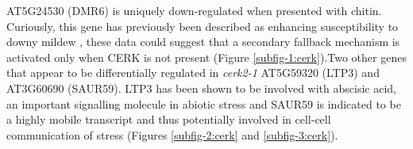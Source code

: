 \documentclass[../main.tex]{subfiles}
\begin{document}
AT5G24530 (DMR6) is uniquely down-regulated when presented with chitin.
Curiously, this gene has previously been described as enhancing susceptibility
to downy mildew \cite{DOWNYMILDEWRESISTANT}, these data could suggest that a
secondary fallback mechanism is activated only when CERK is not present (Figure
\ref{subfig-1:cerk}).Two other genes that appear to be differentially regulated
in \textit{cerk2-1} AT5G59320 (LTP3) and AT3G60690 (SAUR59). LTP3 has been shown
to be involved with abscisic acid, an important signalling molecule in abiotic
stress \cite{vishwakarmaAbscisicAcidSignaling2017} and SAUR59 is indicated to be
a highly mobile transcript \cite{thiemeEndogenousArabidopsisMessenger2015} and
thus potentially involved in cell-cell communication of stress (Figures
\ref{subfig-2:cerk} and \ref{subfig-3:cerk}).
\end{document}
